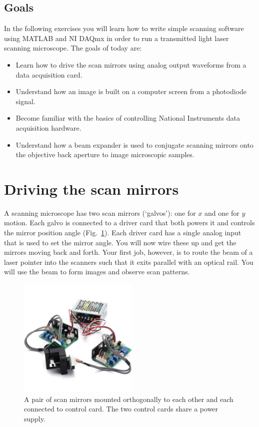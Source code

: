 \documentclass[a4paper]{report}
\begin{document}
\subsection{Goals}
In the following exercises you will learn how to write simple scanning software using MATLAB and NI DAQmx in order to run a transmitted light laser scanning microscope. 
The goals of today are:
\begin{itemize}
\setlength\itemsep{0.15em}
\item Learn how to drive the scan mirrors using analog output waveforms from a data acquisition card. 
\item Understand how an image is built on a computer screen from a photodiode signal. 
\item Become familiar with the basics of controlling National Instruments data acquisition hardware.
\item Understand how a beam expander is used to conjugate scanning mirrors onto the objective back aperture to image microscopic samples.
\end{itemize}

\clearpage


\section{Driving the scan mirrors}
A scanning microscope has two scan mirrors (`galvos'): one for $x$ and one for $y$ motion.
Each galvo is connected to a driver card that both powers it and controls the mirror position angle (Fig.~\ref{scanners}). 
Each driver card has a single analog input that is used to set the mirror angle. 
You will now wire these up and get the mirrors moving back and forth. 
Your first job, however, is to route the beam of a laser pointer into the scanners such that it exits parallel with an optical rail.
You will use the beam to form images and observe scan patterns. 


\begin{figure}[h]
\centering
\includegraphics[width=2.25in]{scanners.png}
\caption{A pair of scan mirrors mounted orthogonally to each other and each connected to control card. The two control cards share a power supply.}
\label{scanners}
\end{figure}
\end{document}
